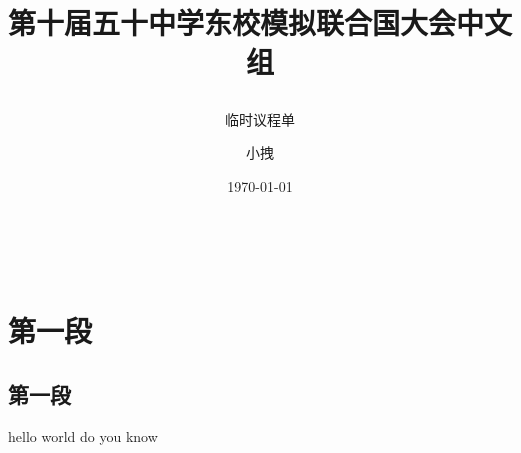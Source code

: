 \documentclass{article}
\title{第十届五十中学东校模拟联合国大会中文组 \\ \subtitle{临时议程单}}
\date{\today}
\author{小拽}
\begin{document}
\
\maketitle
\section{第一段}
\subsection{第一段}
hello world do you know
\end{document}
